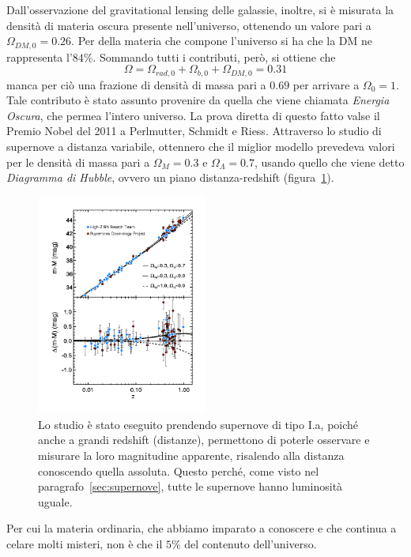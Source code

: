 Dall'osservazione del gravitational lensing delle galassie, inoltre, si è misurata la densità di materia oscura presente nell'universo, ottenendo un valore pari a $\Omega_{DM,0} = 0.26$. Per della materia che compone l'universo si ha che la DM ne rappresenta l'$84\%$. Sommando tutti i contributi, però, si ottiene che
\[
    \Omega = \Omega_{rad,0} + \Omega_{b,0} + \Omega_{DM,0} = 0.31
\]
manca per ciò una frazione di densità di massa pari a $0.69$ per arrivare a $\Omega_0 = 1$. Tale contributo è stato assunto provenire da quella che viene chiamata \textit{Energia Oscura}, che permea l'intero universo. La prova diretta di questo fatto valse il Premio Nobel del 2011 a Perlmutter, Schmidt e Riess. Attraverso lo studio di supernove a distanza variabile, ottennero che il miglior modello prevedeva valori per le densità di massa pari a $\Omega_M = 0.3$ e $\Omega_\Lambda = 0.7$, usando quello che viene detto \textit{Diagramma di Hubble}, ovvero un piano distanza-redshift (figura~\ref{fig:diagramma-hubble}).
\begin{figure}
    \centering
    \includegraphics[width=0.5\textwidth]{immagini/hubble_diagram.png}
    \caption{Lo studio è stato eseguito prendendo supernove di tipo I.a, poiché anche a grandi redshift (distanze), permettono di poterle osservare e misurare la loro magnitudine apparente, risalendo alla distanza conoscendo quella assoluta. Questo perché, come visto nel paragrafo~\ref{sec:supernove}, tutte le supernove hanno luminosità uguale.}\label{fig:diagramma-hubble}
\end{figure}

Per cui la materia ordinaria, che abbiamo imparato a conoscere e che continua a celare molti misteri, non è che il $5\%$ del contenuto dell'universo. 